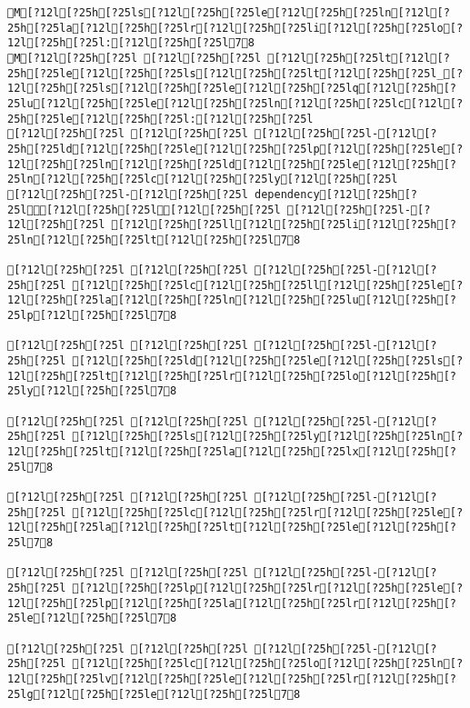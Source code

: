 \documentclass{scrartcl}
\begin{document}
\begin{Verbatim}
M[?12l[?25h[?25ls[?12l[?25h[?25le[?12l[?25h[?25ln[?12l[?25h[?25la[?12l[?25h[?25lr[?12l[?25h[?25li[?12l[?25h[?25lo[?12l[?25h[?25l:[?12l[?25h[?25l78
M[?12l[?25h[?25l [?12l[?25h[?25l [?12l[?25h[?25lt[?12l[?25h[?25le[?12l[?25h[?25ls[?12l[?25h[?25lt[?12l[?25h[?25l_[?12l[?25h[?25ls[?12l[?25h[?25le[?12l[?25h[?25lq[?12l[?25h[?25lu[?12l[?25h[?25le[?12l[?25h[?25ln[?12l[?25h[?25lc[?12l[?25h[?25le[?12l[?25h[?25l:[?12l[?25h[?25l
[?12l[?25h[?25l [?12l[?25h[?25l [?12l[?25h[?25l-[?12l[?25h[?25ld[?12l[?25h[?25le[?12l[?25h[?25lp[?12l[?25h[?25le[?12l[?25h[?25ln[?12l[?25h[?25ld[?12l[?25h[?25le[?12l[?25h[?25ln[?12l[?25h[?25lc[?12l[?25h[?25ly[?12l[?25h[?25l
[?12l[?25h[?25l-[?12l[?25h[?25l dependency[?12l[?25h[?25l[?12l[?25h[?25l[?12l[?25h[?25l [?12l[?25h[?25l-[?12l[?25h[?25l [?12l[?25h[?25ll[?12l[?25h[?25li[?12l[?25h[?25ln[?12l[?25h[?25lt[?12l[?25h[?25l78

[?12l[?25h[?25l [?12l[?25h[?25l [?12l[?25h[?25l-[?12l[?25h[?25l [?12l[?25h[?25lc[?12l[?25h[?25ll[?12l[?25h[?25le[?12l[?25h[?25la[?12l[?25h[?25ln[?12l[?25h[?25lu[?12l[?25h[?25lp[?12l[?25h[?25l78

[?12l[?25h[?25l [?12l[?25h[?25l [?12l[?25h[?25l-[?12l[?25h[?25l [?12l[?25h[?25ld[?12l[?25h[?25le[?12l[?25h[?25ls[?12l[?25h[?25lt[?12l[?25h[?25lr[?12l[?25h[?25lo[?12l[?25h[?25ly[?12l[?25h[?25l78

[?12l[?25h[?25l [?12l[?25h[?25l [?12l[?25h[?25l-[?12l[?25h[?25l [?12l[?25h[?25ls[?12l[?25h[?25ly[?12l[?25h[?25ln[?12l[?25h[?25lt[?12l[?25h[?25la[?12l[?25h[?25lx[?12l[?25h[?25l78

[?12l[?25h[?25l [?12l[?25h[?25l [?12l[?25h[?25l-[?12l[?25h[?25l [?12l[?25h[?25lc[?12l[?25h[?25lr[?12l[?25h[?25le[?12l[?25h[?25la[?12l[?25h[?25lt[?12l[?25h[?25le[?12l[?25h[?25l78

[?12l[?25h[?25l [?12l[?25h[?25l [?12l[?25h[?25l-[?12l[?25h[?25l [?12l[?25h[?25lp[?12l[?25h[?25lr[?12l[?25h[?25le[?12l[?25h[?25lp[?12l[?25h[?25la[?12l[?25h[?25lr[?12l[?25h[?25le[?12l[?25h[?25l78

[?12l[?25h[?25l [?12l[?25h[?25l [?12l[?25h[?25l-[?12l[?25h[?25l [?12l[?25h[?25lc[?12l[?25h[?25lo[?12l[?25h[?25ln[?12l[?25h[?25lv[?12l[?25h[?25le[?12l[?25h[?25lr[?12l[?25h[?25lg[?12l[?25h[?25le[?12l[?25h[?25l78


\end{Verbatim}
\end{document}

